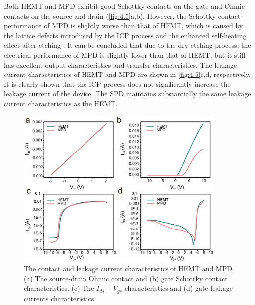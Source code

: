 Both  HEMT  and MPD exhibit good Schottky contacts  on the gate and Ohmic contacts  on the source and drain (\autoref{fig:4.5}a,b). However, the Schottky contact performance of MPD is slightly worse than that of HEMT, which is caused by the lattice defects introduced by the ICP process \cite{choi2003observation,cao2000schottky} and the enhanced self-heating effect after etching \cite{yang2011high,hajjiah2020effect,greco2017temperature}. It can be concluded that due to the dry etching process, the electrical performance of MPD is slightly lower than that of HEMT, but it still has excellent output characteristics and transfer characteristics. The leakage current characteristics of HEMT and MPD are shown in \autoref{fig:4.5}c,d, respectively. It is clearly shown that the ICP process does not significantly increase the leakage current  of the device. The SPD  maintains substantially the same leakage current characteristics  as the HEMT.

\begin{figure}[H] 
\centering    
\includegraphics[width=0.9\textwidth]{ch4_5}
\caption[The contact and leakage characteristics of HEMT and MPD]{The contact and leakage current characteristics of HEMT and MPD (a) The source-drain Ohmic contact and (b) gate Schottky contact characteristics. (c) The $I_{ds}-V_{gs}$ characteristics and (d) gate leakage currents characteristics.}
\label{fig:4.5}
\end{figure}



